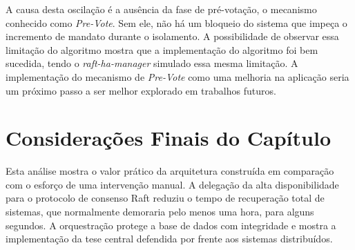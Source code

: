         A causa desta oscilação é a ausência da fase de pré-votação, o mecanismo conhecido como \textit{Pre-Vote}. Sem ele, não há um bloqueio do sistema que impeça o incremento de mandato durante o isolamento. A possibilidade de observar essa limitação do algoritmo mostra que a implementação do algoritmo foi bem sucedida, tendo o \textit{raft-ha-manager} simulado essa mesma limitação. A implementação do mecanismo de \textit{Pre-Vote} como uma melhoria na aplicação seria um próximo passo a ser melhor explorado em trabalhos futuros.

\section{Considerações Finais do Capítulo}

    Esta análise mostra o valor prático da arquitetura construída em comparação com o esforço de uma intervenção manual. A delegação da alta disponibilidade para o protocolo de consenso Raft reduziu o tempo de recuperação total de sistemas, que normalmente demoraria pelo menos uma hora, para alguns segundos. A orquestração protege a base de dados com integridade e mostra a implementação da tese central defendida por  frente aos sistemas distribuídos.
